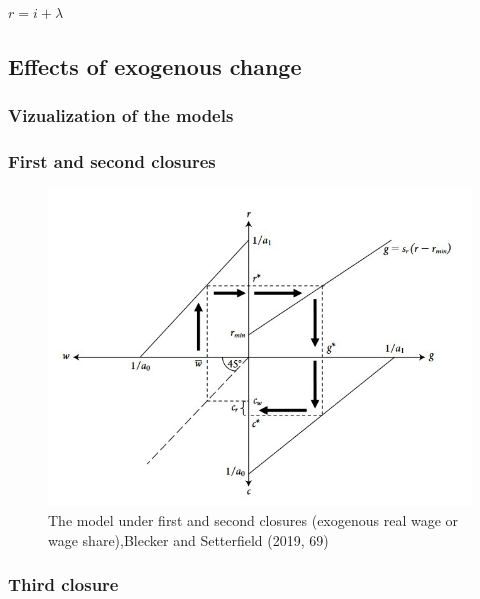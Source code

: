 \documentclass[
  letterpaper,
  DIV=11,
  numbers=noendperiod]{scrreprt}
\begin{document}
\(r = i + \lambda\)

\hypertarget{effects-of-exogenous-change}{%
\subsection{Effects of exogenous
change}\label{effects-of-exogenous-change}}

\hypertarget{vizualization-of-the-models}{%
\subsubsection{Vizualization of the
models}\label{vizualization-of-the-models}}

\hypertarget{first-and-second-closures}{%
\subsubsection{First and second
closures}\label{first-and-second-closures}}

\begin{figure}

{\centering \includegraphics[width=5.11458in,height=\textheight]{images/closure_1.jpg}

}

\caption{The model under first and second closures (exogenous real wage
or wage share),Blecker and Setterfield (2019, 69)}

\end{figure}

\hypertarget{third-closure}{%
\subsubsection{Third closure}\label{third-closure}}
\end{document}
